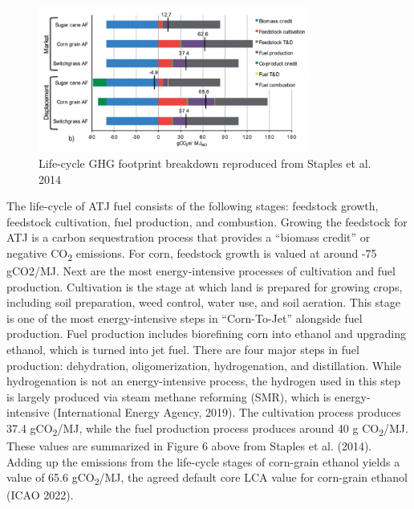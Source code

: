 \documentclass[12pt]{article}
\begin{document}
\begin{figure}[H]
\centering
\includegraphics[width=0.8\textwidth]{Figures/Fig 6.png} %
\caption{Life-cycle GHG footprint breakdown reproduced from Staples et al. 2014}
\label{figure 6}
\end{figure}


 The life-cycle of ATJ fuel consists of the following stages: feedstock growth, feedstock cultivation, fuel production, and combustion. Growing the feedstock for ATJ is a carbon sequestration process that provides a “biomass credit” or negative CO\textsubscript{2} emissions. For corn, feedstock growth is valued at around -75 gCO2/MJ. Next are the most energy-intensive processes of cultivation and fuel production. Cultivation is the stage at which land is prepared for growing crops, including soil preparation, weed control, water use, and soil aeration. This stage is one of the most energy-intensive steps in “Corn-To-Jet” alongside fuel production. Fuel production includes biorefining corn into ethanol and upgrading ethanol, which is turned into jet fuel. There are four major steps in fuel production: dehydration, oligomerization, hydrogenation, and distillation. While hydrogenation is not an energy-intensive process, the hydrogen used in this step is largely produced via steam methane reforming (SMR), which is energy-intensive (International Energy Agency, 2019).  The cultivation process produces 37.4 gCO\textsubscript{2}/MJ, while the fuel production process produces around 40 g CO\textsubscript{2}/MJ. These values are summarized in Figure 6 above from Staples et al. (2014). Adding up the emissions from the life-cycle stages of corn-grain ethanol yields a value of 65.6 gCO\textsubscript{2}/MJ, the agreed default core LCA value for corn-grain ethanol (ICAO 2022).
\end{document}
